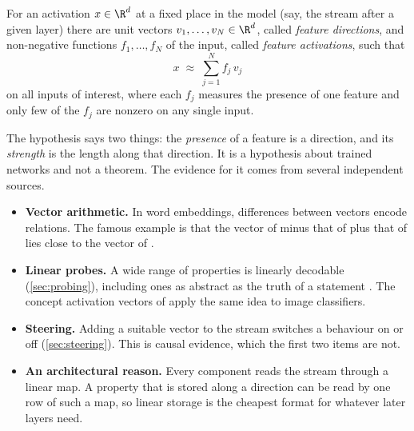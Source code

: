 \begin{definition}\label{def:lrh}
For an activation $x\in\R^d$ at a fixed place in the model (say, the stream after a given layer) there are unit
vectors $v_1,\dots,v_N\in\R^d$, called \emph{feature directions}, and non-negative functions $f_1,\dots,f_N$ of
the input, called \emph{feature activations}, such that
\begin{equation}\label{eq:lrh}
x \;\approx\; \sum_{j=1}^{N}f_j\,v_j
\end{equation}
on all inputs of interest, where each $f_j$ measures the presence of one feature and only few of the $f_j$ are
nonzero on any single input.
\end{definition}

The hypothesis says two things: the \emph{presence} of a feature is a direction, and its \emph{strength} is the
length along that direction. It is a hypothesis about trained networks and not a theorem. The evidence for it
comes from several independent sources.

\begin{itemize}
\item \textbf{Vector arithmetic.} In word embeddings, differences between vectors encode relations. The famous
example is that the vector of  minus that of  plus that of  lies close to the
vector of  \citep{mikolov2013linguistic}.
\item \textbf{Linear probes.} A wide range of properties is linearly decodable (\cref{sec:probing}), including
ones as abstract as the truth of a statement \citep{marks2024geometry}. The concept activation vectors of
\citet{kim2018interpretability} apply the same idea to image classifiers.
\item \textbf{Steering.} Adding a suitable vector to the stream switches a behaviour on or off
(\cref{sec:steering}). This is causal evidence, which the first two items are not.
\item \textbf{An architectural reason.} Every component reads the stream through a linear map. A property that
is stored along a direction can be read by one row of such a map, so linear storage is the cheapest format for
whatever later layers need.
\end{itemize}

